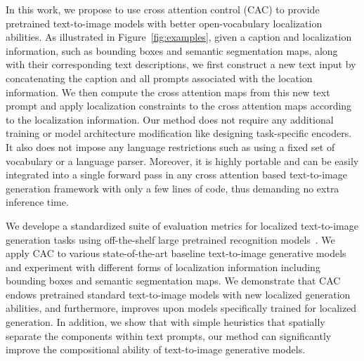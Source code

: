 In this work, we propose to use cross attention control (CAC) to provide pretrained text-to-image models with %
better open-vocabulary localization abilities.
As illustrated in Figure~\ref{fig:examples}, given a caption and localization information, such as bounding boxes and semantic segmentation maps, along with their corresponding text descriptions, we first construct a new text input by concatenating the caption and all prompts associated with the location information. We then compute the cross attention maps from this new text prompt and apply localization constraints to the cross attention maps according to the localization information. 
Our method does not require any additional training or model architecture modification like designing task-specific encoders. It also does not impose any language restrictions such as using a fixed set of vocabulary or a language parser. Moreover, it is highly portable and can be easily integrated into a single forward pass in any cross attention based text-to-image generation framework with only a few lines of code, thus demanding no extra inference time.




We develope a standardized suite of evaluation metrics for localized text-to-image generation tasks using off-the-shelf large pretrained recognition models~\citep{yolo,ssa,sam,glip}.
We apply CAC to various state-of-the-art baseline text-to-image generative models and experiment with different forms of localization information including bounding boxes and semantic segmentation maps. We demonstrate that CAC endows pretrained standard text-to-image models with new localized generation abilities, and furthermore, improves upon models specifically trained for localized generation. In addition, we show that with simple heuristics that spatially separate the components within text prompts, our method can significantly improve the compositional ability of text-to-image generative models.


